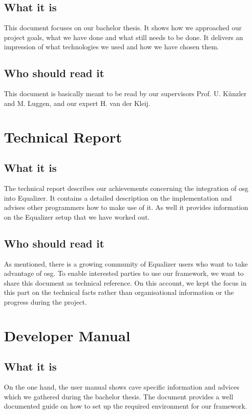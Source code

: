 \subsection*{What it is}
This document focuses on our bachelor thesis. It shows how we approached our project goals, what we have done and what still needs to be done. It delivers an impression of what technologies we used and how we have chosen them. 

\subsection*{Who should read it}
This document is basically meant to be read by our supervisors Prof. U. K\"unzler and M. Luggen, and our expert H. van der Kleij.

\section*{Technical Report}

\subsection*{What it is}
The technical report describes our achievements concerning the integration of \gls{osg} into Equalizer. It contains a detailed description on the implementation and advises other programmers how to make use of it. As well it provides information on the Equalizer setup that we have worked out.

\subsection*{Who should read it}
As mentioned, there is a growing community of Equalizer users who want to take advantage of \gls{osg}. To enable interested parties to use our framework, we want to share this document as technical reference. On this account, we kept the focus in this part on the technical facts rather than organisational information or the progress during the project.

\section*{Developer Manual}

\subsection*{What it is}
On the one hand, the user manual shows \gls{cave} specific information and advices which we gathered during the bachelor thesis. The document provides a well documented guide on how to set up the required environment for our framework.

